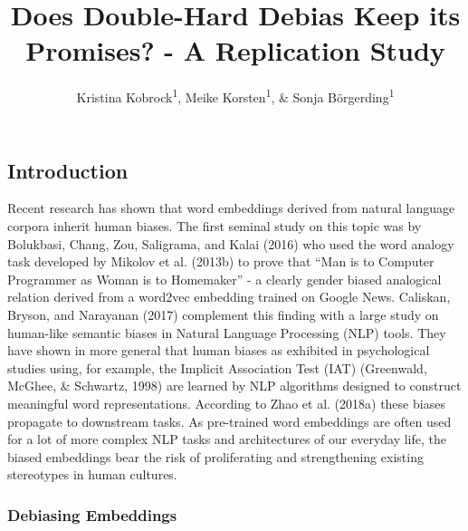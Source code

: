 \documentclass[
  english,
  man,floatsintext]{apa6}
\title{Does Double-Hard Debias Keep its Promises? - A Replication Study}
\author{Kristina Kobrock\textsuperscript{1}, Meike Korsten\textsuperscript{1}, \& Sonja Börgerding\textsuperscript{1}}
\date{}
\affiliation{\vspace{0.5cm}\textsuperscript{1} University of Osnabrück}
\begin{document}
\maketitle

\hypertarget{introduction}{%
\subsection{Introduction}\label{introduction}}

Recent research has shown that word embeddings derived from natural language corpora inherit human biases. The first seminal study on this topic was by Bolukbasi, Chang, Zou, Saligrama, and Kalai (2016) who used the word analogy task developed by Mikolov et al. (2013b) to prove that \enquote{Man is to Computer Programmer as Woman is to Homemaker} - a clearly gender biased analogical relation derived from a word2vec embedding trained on Google News. Caliskan, Bryson, and Narayanan (2017) complement this finding with a large study on human-like semantic biases in Natural Language Processing (NLP) tools. They have shown in more general that human biases as exhibited in psychological studies using, for example, the Implicit Association Test (IAT) (Greenwald, McGhee, \& Schwartz, 1998) are learned by NLP algorithms designed to construct meaningful word representations. According to Zhao et al. (2018a) these biases propagate to downstream tasks. As pre-trained word embeddings are often used for a lot of more complex NLP tasks and architectures of our everyday life, the biased embeddings bear the risk of proliferating and strengthening existing stereotypes in human cultures.

\hypertarget{debiasing-embeddings}{%
\subsubsection{Debiasing Embeddings}\label{debiasing-embeddings}}
\end{document}
